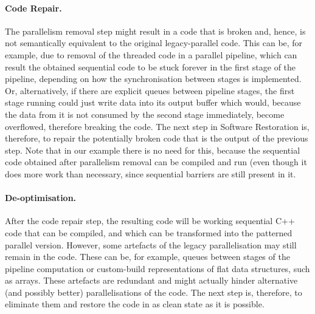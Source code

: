 \paragraph{Code Repair.}
The parallelism removal step might result in a code that is broken and, hence, is not semantically equivalent to the original legacy-parallel code. This can be, for example, due to removal of the threaded code in a parallel pipeline, which can result the obtained sequential code to be stuck forever in the first stage of the pipeline, depending on how the synchronisation between stages is implemented. Or, alternatively, if there are explicit queues between pipeline stages, the first stage running could just write data into its output buffer which would, because the data from it is not consumed by the second stage immediately, become overflowed, therefore breaking the code. The next step in Software Restoration is, therefore, to repair the potentially broken code that is the output of the previous step. Note that in our example there is no need for this, because the sequential code obtained after parallelism removal can be compiled and run (even though it does more work than necessary, since sequential barriers are still present in it.

\paragraph{De-optimisation.}
After the code repair step, the resulting code will be working sequential C++ code that can be compiled, and which can be transformed into the patterned parallel version. However, some artefacts of the legacy parallelisation may still remain in the code. These can be, for example, queues between stages of the pipeline computation or custom-build representations of flat data structures, such as arrays. These artefacts are redundant and might actually hinder alternative (and possibly better) parallelisations of the code. The next step is, therefore, to eliminate them and restore the code in as clean state as it is possible.



